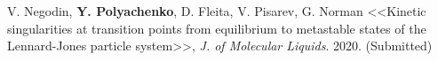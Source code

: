 

\vspace{4mm}

\begin{cvenum}

	\item V. Negodin, \textbf{Y. Polyachenko}, D. Fleita, V. Pisarev, G. Norman <<Kinetic singularities at transition points from equilibrium to metastable states of the Lennard-Jones particle system>>, \textit{J. of Molecular Liquids}. 2020. (Submitted)

\end{cvenum}


\vspace{3mm}

